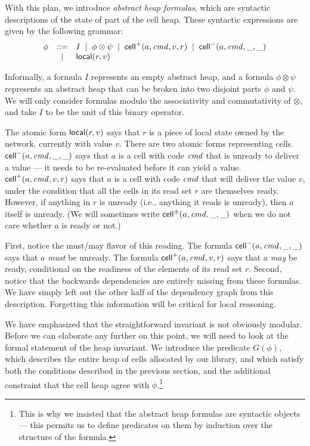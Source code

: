 With this plan, we introduce \emph{abstract heap formulas}, which are
syntactic descriptions of the state of part of the cell heap. These
syntactic expressions are given by the following grammar:
\begin{displaymath}
  \begin{array}{lcl}
    \phi & ::= & I \;\;|\;\; \phi \otimes \psi \;\;|\;\; \mathsf{cell}^{+}({a}, {\mathit{cmd}}, {v}, {r}) \;\;|\;\; \mathsf{cell}^{-}({a}, {\mathit{cmd}}, {\_}, {\_})\\
         &  |  & \mathsf{local}({r}, {v}) 
  \end{array}
\end{displaymath}

Informally, a formula $I$ represents an empty abstract heap, and a
formula $\phi \otimes \psi$ represents an abstract heap that can be
broken into two disjoint parts $\phi$ and $\psi$. We will only
consider formulas modulo the associativity and commutativity of
$\otimes$, and take $I$ to be the unit of this binary operator.

The atomic form $\mathsf{local}({r}, {v})$ says that $r$ is a piece of local
state owned by the network, currently with value $v$. There are two
atomic forms representing cells. $\mathsf{cell}^{-}({a}, {\mathit{cmd}}, {\_}, {\_})$ says that $a$ is
a cell with code $\mathit{cmd}$ that is unready to deliver a value --- it
needs to be re-evaluated before it can yield a
value. $\mathsf{cell}^{+}({a}, {\mathit{cmd}}, {v}, {r})$ says that $a$ is a cell with code
$\mathit{cmd}$ that will deliver the value $v$, under the condition that all
the cells in its read set $r$ are themselves ready. However, if
anything in $r$ is unready (i.e., anything it reads is unready), then
$a$ itself is unready. (We will sometimes write $\mathsf{cell}^{\pm}({a}, {\mathit{cmd}}, {\_}, {\_})$
when we do not care whether $a$ is ready or not.)

First, notice the must/may flavor of this reading. The formula
$\mathsf{cell}^{-}({a}, {\mathit{cmd}}, {\_}, {\_})$ says that $a$ \emph{must} be unready.  The formula
$\mathsf{cell}^{+}({a}, {\mathit{cmd}}, {v}, {r})$ says that $a$ \emph{may} be ready,
conditional on the readiness of the elements of its read set
$r$. Second, notice that the backwards dependencies are entirely
missing from these formulas. We have simply left out the other half of
the dependency graph from this description. Forgetting this
information will be critical for local reasoning.

We have emphasized that the straightforward invariant is not obviously
modular. Before we can elaborate any further on this point, we will
need to look at the formal statement of the heap invariant. We
introduce the predicate $G(\phi)$, which describes the entire heap of
cells allocated by our library, and which satisfy both the conditions
described in the previous section, and the additional constraint that
the cell heap agree with $\phi$.\footnote{This is why we insisted that
  the abstract heap formulas are syntactic objects --- this permits us
  to define predicates on them by induction over the structure of the
formula.}


